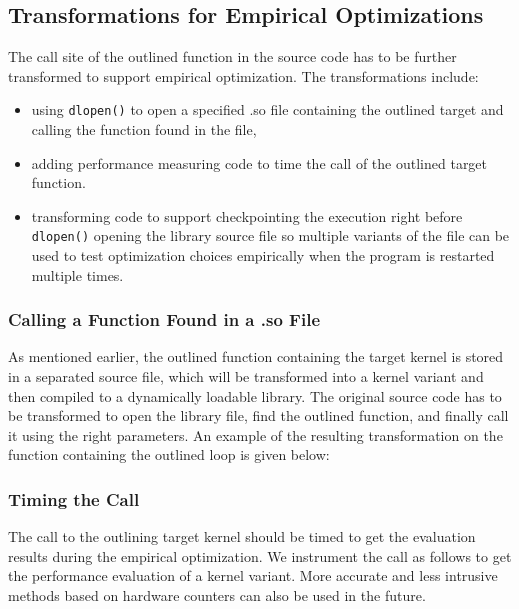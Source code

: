 \subsection{Transformations for Empirical Optimizations}
The call site of the outlined function in the source code has to be further transformed to support empirical optimization. The transformations include:
\begin{itemize}
\item using \lstinline{dlopen()} to open a specified .so file containing
the outlined target and calling the function found in the file,
\item adding performance measuring code to time the call of the outlined target function.
\item transforming code to support checkpointing the execution right before
\lstinline{dlopen()} opening the library source file so multiple variants of the file can be used to test optimization choices empirically when the program is restarted multiple times.
\end{itemize}
\subsubsection{Calling a Function Found in a .so File}
As mentioned earlier, the outlined function containing the target kernel is
stored in a separated source file, which will be transformed into a kernel variant
and then compiled to a dynamically loadable library. 
The original source code has to be transformed to open the library file,
find the outlined function, and finally call it using the right
parameters. An example of the resulting transformation on the function containing the
outlined loop is given below:


\subsubsection{Timing the Call}
The call to the outlining target kernel should be timed to get the
evaluation results during the empirical optimization. 
We instrument the call as follows to get the performance evaluation of a
kernel variant. 
More accurate and less intrusive methods based on hardware
counters can also be used in the future. 

